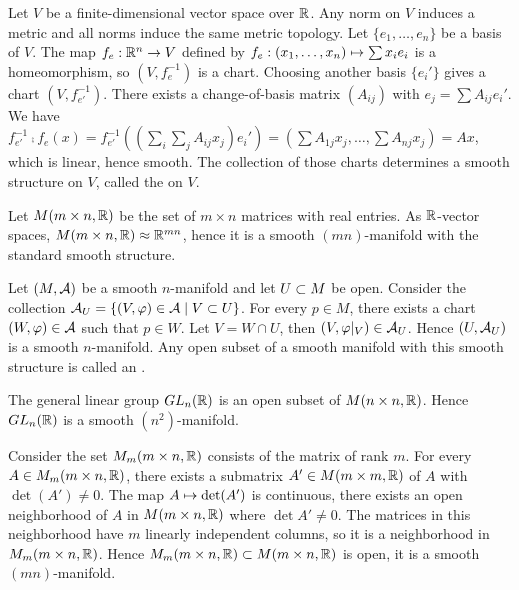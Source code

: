 \documentclass[10pt]{article}
\begin{document}
\begin{example}
    Let $V$ be a finite-dimensional vector space over $\mathbb{R}$. Any norm on $V$ induces a metric and all norms induce the same metric topology. Let $\{{e}_{1},\dots,{e}_{n}\}$ be a basis of $V$. The map ${f}_{e}:{\mathbb{R}}^{n}\to V$ defined by ${f}_{e}:({x}_{1},\dots,{x}_{n})\mapsto\sum{x}_{i}{e}_{i}$ is a homeomorphism, so $(V,{f}_{e}^{-1})$ is a chart. Choosing another basis $\{{e}_{i}'\}$ gives a chart $(V,{f}_{e'}^{-1})$. There exists a change-of-basis matrix $({A}_{ij})$ with ${e}_{j}=\sum{A}_{ij}{e}_{i}'$. We have ${f}_{e'}^{-1}\comp{f}_{e}(x)={f}_{e'}^{-1}(({\sum}_{i}{\sum}_{j}{A}_{ij}{x}_{j}){e}_{i}')=(\sum{A}_{1j}{x}_{j},\dots,\sum{A}_{nj}{x}_{j})=Ax$, which is linear, hence smooth. The collection of those charts determines a smooth structure on $V$, called the  on $V$.
\end{example}
\begin{example}
    Let $M(m\times n,\mathbb{R})$ be the set of $m\times n$ matrices with real entries. As $\mathbb{R}$-vector spaces, $M(m\times n,\mathbb{R})\approx{\mathbb{R}}^{mn}$, hence it is a smooth $(mn)$-manifold with the standard smooth structure.
\end{example}
\begin{example}
    Let $(M,\mathcal{A})$ be a smooth $n$-manifold and let $U\subset M$ be open. Consider the collection ${\mathcal{A}}_{U}=\{(V,\varphi)\in\mathcal{A}\mid V\subset U\}$. For every $p\in M$, there exists a chart $(W,\varphi)\in\mathcal{A}$ such that $p\in W$. Let $V=W\cap U$, then $(V,\varphi{|}_{V})\in{\mathcal{A}}_{U}$. Hence $(U,{\mathcal{A}}_{U})$ is a smooth $n$-manifold. Any open subset of a smooth manifold with this smooth structure is called an .
\end{example}
\begin{example}
    The general linear group ${GL}_{n}(\mathbb{R})$ is an open subset of $M(n\times n,\mathbb{R})$. Hence ${GL}_{n}(\mathbb{R})$ is a smooth $({n}^{2})$-manifold.
\end{example}
\begin{example}
    Consider the set ${M}_{m}(m\times n,\mathbb{R})$ consists of the matrix of rank $m$. For every $A\in{M}_{m}(m\times n,\mathbb{R})$, there exists a submatrix $A'\in M(m\times m,\mathbb{R})$ of $A$ with $\det(A')\ne 0$. The map $A\mapsto\det(A')$ is continuous, there exists an open neighborhood of $A$ in $M(m\times n,\mathbb{R})$ where $\det A'\ne 0$. The matrices in this neighborhood have $m$ linearly independent columns, so it is a neighborhood in ${M}_{m}(m\times n,\mathbb{R})$. Hence ${M}_{m}(m\times n,\mathbb{R})\subset M(m\times n,\mathbb{R})$ is open, it is a smooth $(mn)$-manifold.
\end{example}
\end{document}
